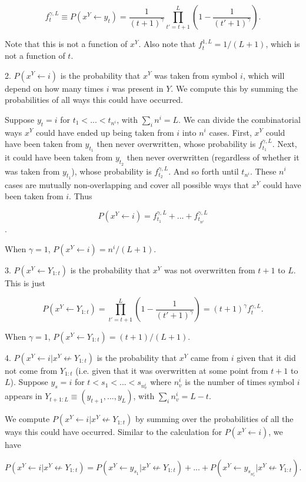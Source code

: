 \documentclass{article}
\begin{document}
\begin{appendices}
$$f^{\gamma,L}_t \equiv P(x^Y \leftarrow y_t) = \frac{1}{(t+1)^\gamma}\prod\limits_{t' = t+1}^L\left(1 - \frac{1}{(t'+1)^\gamma}\right).$$

Note that this is not a function of $x^Y$. Also note that $f^{1,L}_t = 1/(L+1)$, which is not a function of $t$.

2. $P(x^Y \leftarrow i)$ is the probability that $x^Y$ was taken from symbol $i$, which will depend on how many times $i$ was present in $Y$. We compute this by summing the probabilities of all ways this could have occurred.

Suppose $y_t = i$ for $t_1 < ... < t_{n^i}$, with $\sum_i n^i = L$. We can divide the combinatorial ways $x^Y$ could have ended up being taken from $i$ into $n^i$ cases. First, $x^Y$ could have been taken from $y_{t_1}$ then never overwritten, whose probability is $f^{\gamma,L}_{t_1}$. Next, it could have been taken from $y_{t_2}$ then never overwritten (regardless of whether it was taken from $y_{t_1}$), whose probability is $f^{\gamma,L}_{t_2}$. And so forth until $t_{n^i}$. These $n^i$ cases are mutually non-overlapping and cover all possible ways that $x^Y$ could have been taken from $i$. Thus

$$P(x^Y \leftarrow i) = f^{\gamma,L}_{t_1} + ... + f^{\gamma,L}_{t_{n^i}}$$.

When $\gamma = 1$, $P(x^Y \leftarrow i) = n^i/(L+1)$.

3. $P(x^Y \leftarrow Y_{1:t})$ is the probability that $x^Y$ was not overwritten from $t+1$ to $L$. This is just

$$P(x^Y \leftarrow Y_{1:t}) = \prod\limits_{t' = t+1}^L \left(1 - \frac{1}{(t'+1)^\gamma}\right) = (t+1)^\gamma f^{\gamma,L}_t.$$

When $\gamma = 1$, $P(x^Y \leftarrow Y_{1:t}) = (t+1)/(L+1)$.

4. $P(x^Y \leftarrow i|x^Y \not \leftarrow Y_{1:t})$ is the probability that $x^Y$ came from $i$ given that it did not come from $Y_{1:t}$ (i.e. given that it was overwritten at some point from $t+1$ to $L$). Suppose $y_s = i$ for $t < s_1 < ... < s_{n^i_v}$ where $n^i_v$ is the number of times symbol $i$ appears in $Y_{t+1:L} \equiv (y_{t+1}, ..., y_L)$, with $\sum\limits_i n^i_v = L-t$.

We compute $P(x^Y \leftarrow i|x^Y \not \leftarrow Y_{1:t})$ by summing over the probabilities of all the ways this could have occurred. Similar to the calculation for $P(x^Y \leftarrow i)$, we have

$$P(x^Y \leftarrow i|x^Y \not \leftarrow Y_{1:t}) = P(x^Y \leftarrow y_{s_1}| x^Y \not \leftarrow Y_{1:t}) + ... + P(x^Y \leftarrow y_{s_{n^i_v}}| x^Y \not \leftarrow Y_{1:t}).$$


\end{appendices}
\end{document}
